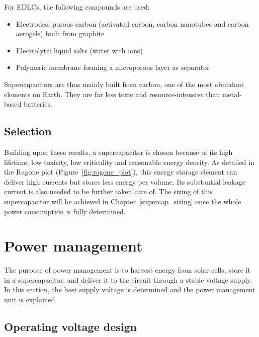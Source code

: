 \documentclass{EPL-master-thesis-covers-EN}
\begin{document}
For EDLCs, the following compounds are used:

\begin{itemize}
 \item Electrodes: porous carbon (activated carbon, carbon nanotubes and carbon aerogels) built from graphite \cite{Hastak}
 \item Electrolyte: liquid salts (water with ions)
 \item Polymeric membrane forming a microporous layer as separator
\end{itemize}

Supercapacitors are thus mainly built from carbon, one of the most abundant elements on Earth. They are far less toxic and resource-intensive than metal-based batteries.

    
\section{Selection}

Building upon these results, a supercapacitor is chosen because of its high lifetime, low toxicity, low criticality and reasonable energy density. As detailed in the Ragone plot (Figure~\ref{fig:ragone_plot}), this energy storage element can deliver high currents but stores less energy per volume. Its substantial leakage current is also needed to be further taken care of. The sizing of this supercapacitor will be achieved in Chapter~\ref{supercap_sizing} once the whole power consumption is fully determined. 


\chapter{Power management}

The purpose of power management is to harvest energy from solar cells, store it in a supercapacitor, and deliver it to the circuit through a stable voltage supply. In this section, the best supply voltage is determined and the power management unit is explained.

\section{Operating voltage design}
\label{section:operating_voltage}
\end{document}
